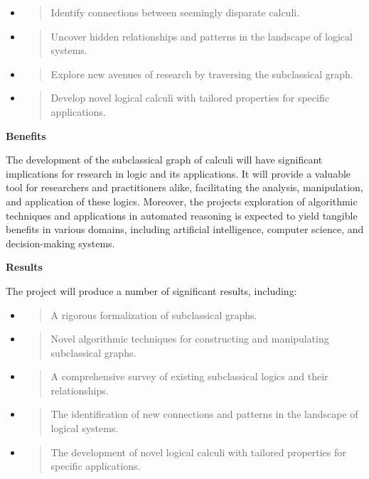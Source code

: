 \begin{itemize}
\item
  \begin{quote}
  Identify connections between seemingly disparate calculi.
  \end{quote}
\item
  \begin{quote}
  Uncover hidden relationships and patterns in the landscape of logical
  systems.
  \end{quote}
\item
  \begin{quote}
  Explore new avenues of research by traversing the subclassical graph.
  \end{quote}
\item
  \begin{quote}
  Develop novel logical calculi with tailored properties for specific
  applications.
  \end{quote}
\end{itemize}

\textbf{Benefits}

The development of the subclassical graph of calculi will have
significant implications for research in logic and its applications. It
will provide a valuable tool for researchers and practitioners alike,
facilitating the analysis, manipulation, and application of these
logics. Moreover, the project\textquotesingle s exploration of
algorithmic techniques and applications in automated reasoning is
expected to yield tangible benefits in various domains, including
artificial intelligence, computer science, and decision-making systems.

\textbf{Results}

The project will produce a number of significant results, including:

\begin{itemize}
\item
  \begin{quote}
  A rigorous formalization of subclassical graphs.
  \end{quote}
\item
  \begin{quote}
  Novel algorithmic techniques for constructing and manipulating
  subclassical graphs.
  \end{quote}
\item
  \begin{quote}
  A comprehensive survey of existing subclassical logics and their
  relationships.
  \end{quote}
\item
  \begin{quote}
  The identification of new connections and patterns in the landscape of
  logical systems.
  \end{quote}
\item
  \begin{quote}
  The development of novel logical calculi with tailored properties for
  specific applications.
  \end{quote}
\end{itemize}

